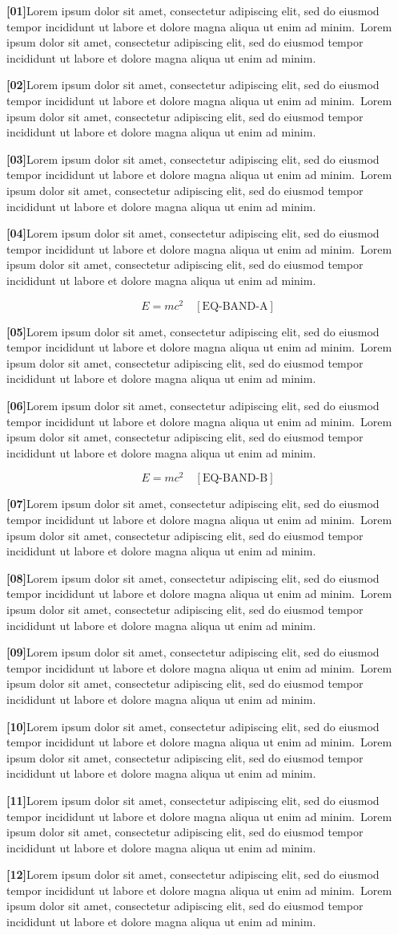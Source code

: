 \documentclass[twocolumn]{article}
\newcommand\Body{Lorem ipsum dolor sit amet, consectetur adipiscing elit, sed do
eiusmod tempor incididunt ut labore et dolore magna aliqua ut enim ad minim.}
\newcommand\Par[1]{\par\noindent\textbf{[#1]}\space\Body\ \Body\par\medskip}
\begin{document}
\Par{01}\Par{02}\Par{03}\Par{04}
\begin{wideband}\[ E=mc^2 \quad[\text{EQ-BAND-A}] \]\end{wideband}
\Par{05}\Par{06}
\begin{wideband}\[ E=mc^2 \quad[\text{EQ-BAND-B}] \]\end{wideband}
\Par{07}\Par{08}\Par{09}\Par{10}\Par{11}\Par{12}
\end{document}
